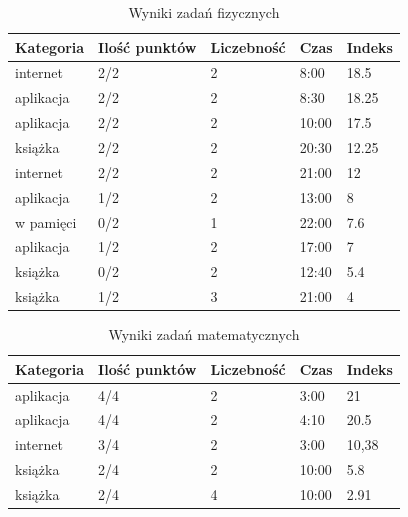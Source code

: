 \documentclass[10pt]{beamer}
\begin{document}
\begin{frame}
  \begin{table}[H]
    \caption{Wyniki zadań fizycznych}
    \centering
    \begin{tabular}{@{}lllll@{}}
      \toprule
      Kategoria & Ilość punktów & Liczebność & Czas & Indeks \\
      \midrule
      internet & 2/2 & 2 & 8:00 & 18.5 \\
      aplikacja & 2/2 & 2 & 8:30 & 18.25 \\
      aplikacja & 2/2 & 2 & 10:00 & 17.5 \\
      książka & 2/2 & 2 & 20:30 & 12.25 \\
      internet & 2/2 & 2 & 21:00 & 12 \\
      aplikacja & 1/2 & 2 & 13:00 & 8 \\
      w pamięci & 0/2 & 1 & 22:00 & 7.6 \\
      aplikacja & 1/2 & 2 & 17:00 & 7 \\
      książka & 0/2 & 2 & 12:40 & 5.4 \\
      książka & 1/2 & 3 & 21:00 & 4 \\
      \bottomrule
    \end{tabular}
  \end{table}

\end{frame}

\begin{frame}
  \begin{table}[H]
    \caption{Wyniki zadań matematycznych}
    \centering
    \begin{tabular}{@{}lllll@{}}
      \toprule
      Kategoria & Ilość punktów & Liczebność & Czas & Indeks \\
      \midrule
      aplikacja & 4/4 & 2 & 3:00 & 21 \\
      aplikacja & 4/4 & 2 & 4:10 & 20.5 \\
      internet & 3/4 & 2 & 3:00 & 10,38 \\
      książka & 2/4 & 2 & 10:00 & 5.8 \\
      książka & 2/4 & 4 & 10:00 & 2.91 \\
      \bottomrule
    \end{tabular}
  \end{table}

\end{frame}
\end{document}

